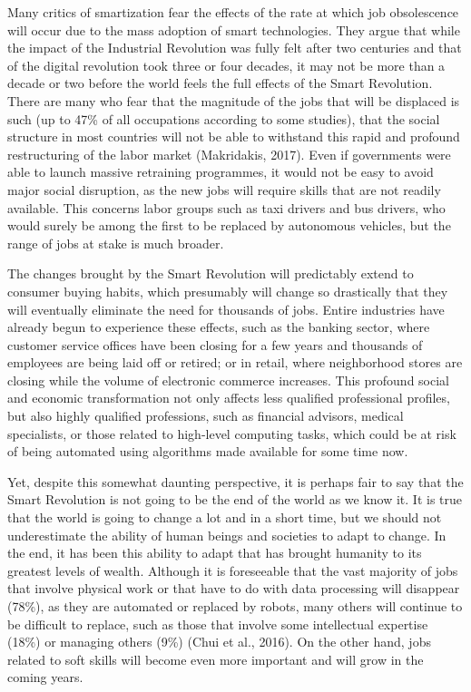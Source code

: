 \documentclass[
  letterpaper,
  DIV=11,
  numbers=noendperiod]{scrreprt}
\begin{document}
Many critics of smartization fear the effects of the rate at which job
obsolescence will occur due to the mass adoption of smart technologies.
They argue that while the impact of the Industrial Revolution was fully
felt after two centuries and that of the digital revolution took three
or four decades, it may not be more than a decade or two before the
world feels the full effects of the Smart Revolution. There are many who
fear that the magnitude of the jobs that will be displaced is such (up
to 47\% of all occupations according to some studies), that the social
structure in most countries will not be able to withstand this rapid and
profound restructuring of the labor market (Makridakis, 2017). Even if
governments were able to launch massive retraining programmes, it would
not be easy to avoid major social disruption, as the new jobs will
require skills that are not readily available. This concerns labor
groups such as taxi drivers and bus drivers, who would surely be among
the first to be replaced by autonomous vehicles, but the range of jobs
at stake is much broader.

The changes brought by the Smart Revolution will predictably extend to
consumer buying habits, which presumably will change so drastically that
they will eventually eliminate the need for thousands of jobs. Entire
industries have already begun to experience these effects, such as the
banking sector, where customer service offices have been closing for a
few years and thousands of employees are being laid off or retired; or
in retail, where neighborhood stores are closing while the volume of
electronic commerce increases. This profound social and economic
transformation not only affects less qualified professional profiles,
but also highly qualified professions, such as financial advisors,
medical specialists, or those related to high-level computing tasks,
which could be at risk of being automated using algorithms made
available for some time now.

Yet, despite this somewhat daunting perspective, it is perhaps fair to
say that the Smart Revolution is not going to be the end of the world as
we know it. It is true that the world is going to change a lot and in a
short time, but we should not underestimate the ability of human beings
and societies to adapt to change. In the end, it has been this ability
to adapt that has brought humanity to its greatest levels of wealth.
Although it is foreseeable that the vast majority of jobs that involve
physical work or that have to do with data processing will disappear
(78\%), as they are automated or replaced by robots, many others will
continue to be difficult to replace, such as those that involve some
intellectual expertise (18\%) or managing others (9\%) (Chui et al.,
2016). On the other hand, jobs related to soft skills will become even
more important and will grow in the coming years.
\end{document}
